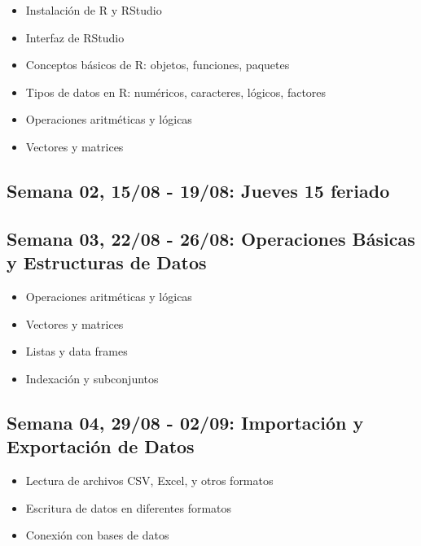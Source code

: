 \documentclass[11pt,letter,]{article}
\providecommand{\tightlist}{%
  \setlength{\itemsep}{0pt}\setlength{\parskip}{0pt}}
\begin{document}
\begin{itemize}
\tightlist
\item
  Instalación de R y RStudio
\item
  Interfaz de RStudio
\item
  Conceptos básicos de R: objetos, funciones, paquetes
\item
  Tipos de datos en R: numéricos, caracteres, lógicos, factores
\item
  Operaciones aritméticas y lógicas
\item
  Vectores y matrices
\end{itemize}

\hypertarget{semana-02-1508---1908-jueves-15-feriado}{%
\subsection{Semana 02, 15/08 - 19/08: Jueves 15
feriado}\label{semana-02-1508---1908-jueves-15-feriado}}

\hypertarget{semana-03-2208---2608-operaciones-buxe1sicas-y-estructuras-de-datos}{%
\subsection{Semana 03, 22/08 - 26/08: Operaciones Básicas y Estructuras
de
Datos}\label{semana-03-2208---2608-operaciones-buxe1sicas-y-estructuras-de-datos}}

\begin{itemize}
\tightlist
\item
  Operaciones aritméticas y lógicas
\item
  Vectores y matrices
\item
  Listas y data frames
\item
  Indexación y subconjuntos
\end{itemize}

\hypertarget{semana-04-2908---0209-importaciuxf3n-y-exportaciuxf3n-de-datos}{%
\subsection{Semana 04, 29/08 - 02/09: Importación y Exportación de
Datos}\label{semana-04-2908---0209-importaciuxf3n-y-exportaciuxf3n-de-datos}}

\begin{itemize}
\tightlist
\item
  Lectura de archivos CSV, Excel, y otros formatos
\item
  Escritura de datos en diferentes formatos
\item
  Conexión con bases de datos
\end{itemize}
\end{document}
